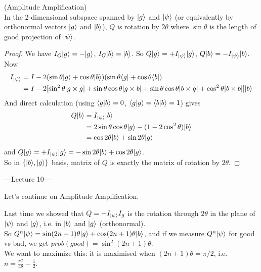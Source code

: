 \documentclass[a4paper]{article}
\begin{document}
\begin{thm} (Amplitude Amplification)\\
In the 2-dimensional subspace spanned by $|g\rangle$ and $|\psi\rangle$ (or equivalently by orthonormal vectors $|g\rangle$ and $|b\rangle$), $Q$ is rotation by $2\theta$ where $\sin\theta$ is the length of good projection of $|\psi\rangle$.
    \begin{proof}
        We have $I_G|g\rangle = -|g\rangle$, $I_G|b\rangle = |b\rangle$. So $Q|g\rangle = +I_{|\psi\rangle} |g\rangle$, $Q|b\rangle = -I_{|\psi\rangle} |b\rangle$.\\
        Now 
        \begin{equation*}
            \begin{aligned}
                I_{|\psi\rangle} &= I-2(\sin\theta|g\rangle + \cos\theta|b\rangle)(\sin\theta\langle g| + \cos\theta\langle b|)\\
                &= I-2[\sin^2\theta |g\times g| + \sin\theta\cos\theta |g\times b| + \sin\theta\cos\theta|b \times g| + \cos^2\theta |b\times b|] |b\rangle
            \end{aligned}
        \end{equation*}
        And direct calculation (using $\langle g| b\rangle =0$, $\langle g|g\rangle = \langle b|b\rangle = 1$) gives 
        \begin{equation*}
            \begin{aligned}
                Q|b\rangle &= I_{|\psi\rangle} |b\rangle\\
                &=2\sin\theta\cos\theta |g\rangle - (1-2\cos^2\theta) |b\rangle\\
                &= \cos 2\theta |b\rangle + \sin 2\theta|g\rangle
            \end{aligned}
        \end{equation*}
        and $Q|g\rangle = +I_{|\psi\rangle} |g\rangle = -\sin 2\theta |b\rangle + \cos 2\theta |g\rangle$.\\
        So in $\{|b\rangle,|g\rangle\}$ basis, matrix of $Q$ is exactly the matrix of rotation by $2\theta$.
    \end{proof}
\end{thm}

---Lecture 10---

Let's continue on Amplitude Amplification.

Last time we showed that $Q=-I_{|\psi\rangle} I_g$ is the rotation through $2\theta$ in the plane of $|\psi\rangle$ and $|g\rangle$, i.e. in $|b\rangle$ and $|g\rangle$ (orthonormal).\\
So $Q^n|\psi\rangle = \sin(2n+1)\theta |g\rangle + \cos(2n+1)\theta |b\rangle$, and if we measure $Q^n |\psi\rangle$ for good vs bad, we get $prob(good) = \sin^2(2n+1)\theta$.\\
We want to maximize this: it is maximised when $(2n+1)\theta = \pi/2$, i.e. $n=\frac{\pi^2}{4\theta} - \frac{1}{2}$.
\end{document}
